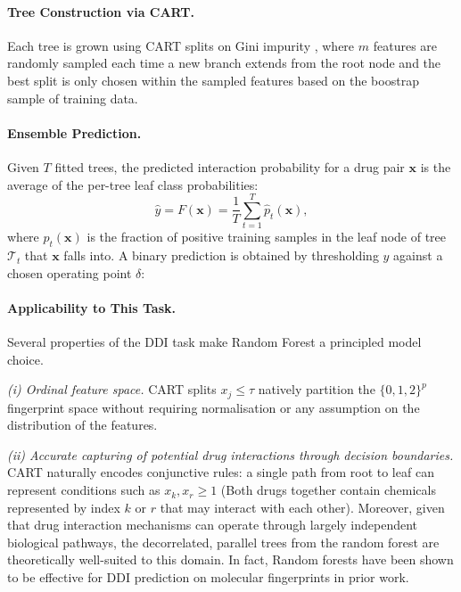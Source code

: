 \documentclass[letterpaper]{article} %
\begin{document}
\paragraph{Tree Construction via CART.}
Each tree is grown using CART splits on Gini impurity \cite{Breiman1984}, where $m$ features are randomly sampled each time a new branch extends from the root node and the best split is only chosen within the sampled features based on the boostrap sample of training data.

\paragraph{Ensemble Prediction.}
Given $T$ fitted trees, the predicted interaction probability for a drug pair $\mathbf{x}$ is the average of the per-tree leaf class probabilities:
\begin{equation}
    \hat{y} = F(\mathbf{x}) = \frac{1}{T} \sum_{t=1}^{T} \hat{p}_t(\mathbf{x}),
    \label{eq:rf_pred}
\end{equation}
where $\hat{p}_t(\mathbf{x})$ is the fraction of positive training samples in the leaf node of tree $\mathcal{T}_t$ that $\mathbf{x}$ falls into. A binary prediction is obtained by thresholding $\hat{y}$ against a chosen operating point $\delta$:

\paragraph{Applicability to This Task.}
Several properties of the DDI task make Random Forest a principled model choice.
 
\textit{(i) Ordinal feature space.} CART splits $x_j \leq \tau$ natively partition the $\{0,1,2\}^p$ fingerprint space without requiring normalisation or any assumption on the distribution of the features.

\textit{(ii) Accurate capturing of potential drug interactions through decision boundaries.} CART naturally encodes conjunctive rules: a single path from root to leaf can represent conditions such as  $x_k, x_r \geq 1$ (Both drugs together contain chemicals represented by index $k$ or $r$ that may interact with each other). Moreover, given that drug interaction mechanisms can operate through largely independent biological pathways, the decorrelated, parallel trees from the random forest are theoretically well-suited to this domain. In fact, Random forests have been shown to be effective for DDI prediction on molecular fingerprints in prior work\cite{Ryu2018}.
\end{document}
